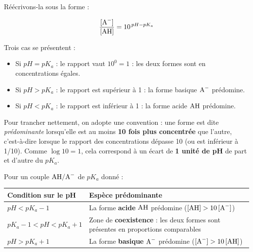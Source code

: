\documentclass[11pt]{article}
\newcommand{\cle}[1]{{\popxbold\color{popdark}#1}}
\begin{document}
Réécrivons-la sous la forme :

\[ \frac{[\ce{A-}]}{[\ce{AH}]} = 10^{\,pH - pK_a} \]

Trois cas se présentent :

\begin{itemize}
\item Si $pH = pK_a$ : le rapport vaut $10^0 = 1$ : les deux formes sont en concentrations égales.
\item Si $pH > pK_a$ : le rapport est supérieur à 1 : la forme \cle{basique} $\ce{A-}$ prédomine.
\item Si $pH < pK_a$ : le rapport est inférieur à 1 : la forme \cle{acide} $\ce{AH}$ prédomine.
\end{itemize}

Pour trancher nettement, on adopte une convention : une forme est dite \emph{prédominante} lorsqu'elle est au moins \textbf{10 fois plus concentrée} que l'autre, c'est-à-dire lorsque le rapport des concentrations dépasse 10 (ou est inférieur à 1/10). Comme $\log 10 = 1$, cela correspond à un écart de \textbf{1 unité de pH} de part et d'autre du $pK_a$.

\begin{aretenir}
Pour un couple $\ce{AH}/\ce{A-}$ de $pK_a$ donné :

\begin{center}
\begin{tabularx}{\linewidth}{|l|X|}
\hline
\rowcolor{popblueL} \textbf{Condition sur le pH} & \textbf{Espèce prédominante} \\
\hline
$pH < pK_a - 1$ & La forme \textbf{acide} $\ce{AH}$ prédomine ($[\ce{AH}] > 10\,[\ce{A-}]$) \\
\hline
$pK_a - 1 < pH < pK_a + 1$ & Zone de \textbf{coexistence} : les deux formes sont présentes en proportions comparables \\
\hline
$pH > pK_a + 1$ & La forme \textbf{basique} $\ce{A-}$ prédomine ($[\ce{A-}] > 10\,[\ce{AH}]$) \\
\hline
\end{tabularx}
\end{center}
\end{aretenir}
\end{document}
